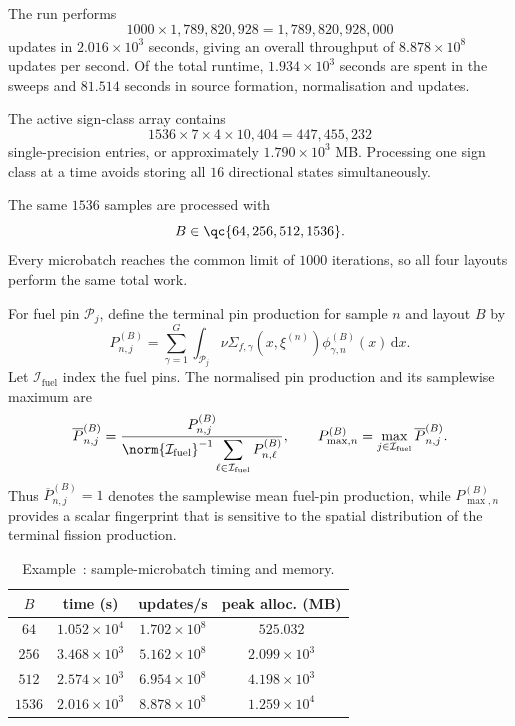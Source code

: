 \documentclass[final]{amsart}
\newcounter{numexample}
\newcommand{\CurrentExample}{Example~\thenumexample}
\begin{document}
The run performs
\[
1000\times1{,}789{,}820{,}928
=
1{,}789{,}820{,}928{,}000
\]
updates in $2.016\times10^3$ seconds, giving an overall throughput of
$8.878\times10^8$ updates per second. Of the total runtime,
$1.934\times10^3$ seconds are spent in the sweeps and $81.514$ seconds
in source formation, normalisation and updates.

The active sign-class array contains
\[
1536\times7\times4\times10{,}404
=
447{,}455{,}232
\]
single-precision entries, or approximately $1.790\times10^3$ MB.
Processing one sign class at a time avoids storing all $16$
directional states simultaneously.

The same $1536$ samples are processed with
\begin{equation}
B\in\qc{64,256,512,1536}.
\label{eq:pincell_microbatch_sizes}
\end{equation}
Every microbatch reaches the common limit of $1000$ iterations, so all
four layouts perform the same total work.

For fuel pin $\mathcal P_j$, define the terminal pin production for
sample $n$ and layout $B$ by
\begin{equation}
P_{n,j}^{(B)}
=
\sum_{\gamma=1}^{G}
\int_{\mathcal P_j}
\nu\Sigma_{f,\gamma}(x,\xi^{(n)})
\phi_{\gamma,n}^{(B)}(x)\,\mathrm dx.
\label{eq:pincell_pin_power}
\end{equation}
Let $\mathcal I_{\mathrm{fuel}}$ index the fuel pins. The normalised pin
production and its samplewise maximum are
\begin{equation}
\overline P_{n,j}^{(B)}
=
\frac{
P_{n,j}^{(B)}
}{
\norm{\mathcal I_{\mathrm{fuel}}}^{-1}
\displaystyle
\sum_{\ell\in\mathcal I_{\mathrm{fuel}}}
P_{n,\ell}^{(B)}
},
\qquad
P_{\max,n}^{(B)}
=
\max_{j\in\mathcal I_{\mathrm{fuel}}}
\overline P_{n,j}^{(B)}.
\label{eq:pincell_normalised_pin_power}
\end{equation}
Thus $\overline P_{n,j}^{(B)}=1$ denotes the samplewise mean fuel-pin
production, while $P_{\max,n}^{(B)}$ provides a scalar fingerprint that
is sensitive to the spatial distribution of the terminal fission
production.


\begin{table}[h!]
\centering
\scriptsize
\setlength{\tabcolsep}{4pt}
\begin{tabular}{cccc}
\hline
$B$ & time (s) & updates/s & peak alloc. (MB) \\
\hline
$64$ & $1.052\times 10^{4}$ & $1.702\times 10^{8}$ & $525.032$ \\
$256$ & $3.468\times 10^{3}$ & $5.162\times 10^{8}$ & $2.099\times 10^{3}$  \\
$512$ & $2.574\times 10^{3}$ & $6.954\times 10^{8}$ & $4.198\times 10^{3}$  \\
$1536$ & $2.016\times 10^{3}$ & $8.878\times 10^{8}$ & $1.259\times 10^{4}$ \\
\hline
\end{tabular}
\caption{\CurrentExample: sample-microbatch timing and memory.}
\label{tab:pincell_microbatching}
\end{table}
\end{document}

